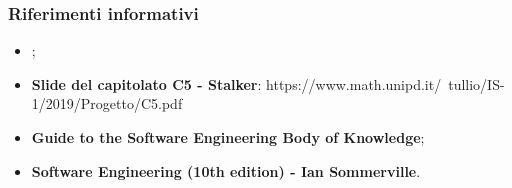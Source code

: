 \subsubsection{Riferimenti informativi}
\begin{itemize}
\item {};
\item \textbf{Slide del capitolato C5 - Stalker}: https://www.math.unipd.it/~tullio/IS-1/2019/Progetto/C5.pdf
\item \textbf{Guide to the Software Engineering Body of Knowledge};
\item \textbf{Software Engineering (10th edition) - Ian Sommerville}.
\end{itemize}

